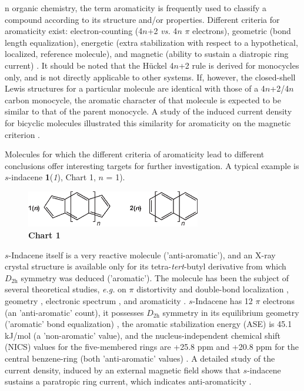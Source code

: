 \lettrine{}{}n organic chemistry, the term aromaticity is frequently used to classify a compound according to its structure and/or properties. Different criteria for aromaticity exist: electron-counting (4$n$+2 \textit{vs.} 4$n$ $\pi$ electrons), geometric (bond length equalization), energetic (extra stabilization with respect to a hypothetical, localized, reference molecule), and magnetic (ability to sustain a diatropic ring current)  \cite{r01,r02,r03,r04}. It should be noted that the H\"uckel 4$n$+2 rule is derived for monocycles only, and is not directly applicable to other systems. If, however, the closed-shell Lewis structures for a particular molecule are identical with those of a 4$n$+2/4$n$ carbon monocycle, the aromatic character of that molecule is expected to be similar to that of the parent monocycle. A study of the induced current density for bicyclic molecules illustrated this similarity for aromaticity on the magnetic criterion  \cite{r05}.

Molecules for which the different criteria of aromaticity lead to different conclusions offer interesting targets for further investigation. A typical example is $s$-indacene \textbf{1}(\textit{1}), Chart 1, $n$ = 1).
\begin{figure}[htp]
\center
\includegraphics[width=3in]{indacene/figures/chart1.eps}\\
\textbf{Chart 1}
\end{figure}
$s$-Indacene itself is a very reactive molecule  \cite{r06} ('anti-aromatic'), and an \mbox{X-ray} crystal structure is available only for its tetra-\textit{tert}-butyl derivative  \cite{r07} from which $D_\mathrm{2h}$ symmetry was deduced ('aromatic'). The molecule has been the subject of several theoretical studies, \textit{e.g.} on $\pi$ distortivity and double-bond localization  \cite{r08}, geometry  \cite{r09,r10}, electronic spectrum  \cite{r11,r12}, and aromaticity  \cite{r13,r14}. $s$-Indacene has 12 $\pi$ electrons (an 'anti-aromatic' count), it possesses $D_\mathrm{2h}$ symmetry in its equilibrium geometry ('aromatic' bond equalization)  \cite{r10}, the aromatic stabilization energy (ASE) is 45.1 kJ/mol (a 'non-aromatic' value), and the nucleus-independent chemical shift (NICS)  \cite{r15} values for the five-membered rings are +25.8 ppm and +20.8 ppm for the central benzene-ring (both 'anti-aromatic' values)  \cite{r13}. A detailed study of the current density, induced by an external magnetic field shows that $s$-indacene sustains a paratropic ring current, which indicates anti-aromaticity  \cite{r14}.

